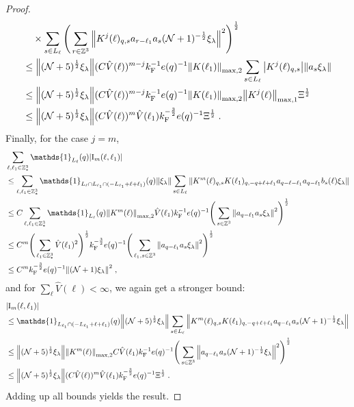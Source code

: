 \documentclass[12pt,a4paper]{article}
\numberwithin{equation}{section}
\newcommand{\1}{\mathbb{I}}
\newcommand{\F}{\mathrm{F}}
\newcommand{\I}{\mathrm{I}}
\newcommand{\Z}{\mathbb{Z}}
\newcommand{\NN}{\mathcal{N}}
\newcommand{\half}{\frac{1}{2}}
\theoremstyle{plain}
\theoremstyle{definition}
\theoremstyle{remark}
\theoremstyle{plain}
\theoremstyle{definition}
\theoremstyle{remark}
\begin{document}
\begin{proof}
\begin{align}
	&\quad \times \sum_{s\in L_{\ell}} \Bigg( \sum_{r \in \Z^3}\norm{K^{j}(\ell)_{q,s} a_{r-\ell_1} a_s (\NN+1)^{-\half} \xi_\lambda }^2 \Bigg)^\half \nonumber\\
	&\leq \norm{ (\NN+5)^{\half} \xi_\lambda}
		(C \hat{V}(\ell))^{m-j} k_{\F}^{-1} e(q)^{-1}
		\norm{K(\ell_1)}_{\max,2}
		\sum_{s\in L_{\ell}}\abs{K^{j}(\ell)_{q,s}}
		\norm{a_s \xi_\lambda }		
	\nonumber\\
	&\leq \norm{(\NN+5)^\half \xi_\lambda }
		(C \hat{V}(\ell))^{m-j} k_{\F}^{-1} e(q)^{-1}
		\norm{ K(\ell_1) }_{\max,2}
		\norm{ K^{j}(\ell)}_{\mathrm{max,1}} \Xi^\half \nonumber \\
	&\leq \norm{(\NN+5)^\half \xi_\lambda }
		(C \hat{V}(\ell))^m
		\hat{V}(\ell_1)
		k_{\F}^{-\frac 32} e(q)^{-1} \Xi^\half \;.
\end{align}
Finally, for the case $ j = m $,
\begin{align}
	&\sum_{\ell,\ell_1 \in \Z^3_*} \mathds{1}_{L_\ell}(q) |\I_m(\ell, \ell_1)| \nonumber\\
	&\leq \sum_{\ell,\ell_1 \in \Z^3_*} \mathds{1}_{L_\ell \cap L_{\ell_1} \cap (-L_{\ell_1} + \ell + \ell_1)}(q) \norm{\xi_\lambda}
		\sum\limits_{s \in L_{\ell}}
		\norm{ K^m(\ell)_{q,s} K(\ell_1)_{q,-q+\ell+\ell_1} a_{q-\ell-\ell_1} a_{q-\ell_1} b_{s}(\ell) \xi_\lambda } \nonumber\\
	&\leq C
		\sum_{\ell,\ell_1 \in \Z^3_*} \mathds{1}_{L_\ell}(q)
		\norm{K^m(\ell)}_{\max,2} \hat{V}(\ell_1) k_{\F}^{-1} e(q)^{-1}
		\Bigg(\sum\limits_{s \in \Z^3} \norm{ a_{q-\ell_1} a_s \xi_\lambda }^2\Bigg)^\half \nonumber\\
	&\leq C^m
		\Bigg( \sum_{\ell_1 \in \Z^3_*} \hat{V}(\ell_1)^2 \Bigg)^{\half}
		k_{\F}^{-\frac 32} e(q)^{-1}
		\Bigg(\sum\limits_{\ell_1,s \in \Z^3} \norm{ a_{q-\ell_1} a_s \xi_\lambda }^2\Bigg)^\half \nonumber\\
	&\leq C^m k_{\F}^{-\frac 32} e(q)^{-1} \norm{(\NN+1) \xi_\lambda }^2 \;, \label{eq:estEQ1123_Coulomb}
\end{align}
and for $ \sum_{\ell} \hat{V}(\ell) < \infty $, we again get a stronger bound:
\begin{align}
	&|\I_m(\ell, \ell_1)| \nonumber\\
	&\leq \mathds{1}_{L_{\ell_1} \cap (-L_{\ell_1} + \ell + \ell_1)}(q) \norm{(\NN+5)^{\half} \xi_\lambda}
		\sum_{s \in L_{\ell}}
		\norm{ K^m(\ell)_{q,s} K(\ell_1)_{q,-q+\ell+\ell_1} a_{q-\ell_1} a_s (\NN+1)^{-\half} \xi_\lambda } \nonumber\\
	&\leq \norm{(\NN+5)^{\half} \xi_\lambda}
		\norm{K^m(\ell)}_{\max,2}
		C \hat{V}(\ell_1) k_{\F}^{-1} e(q)^{-1}
		\Bigg(\sum_{s \in \Z^3}  \norm{ a_{q-\ell_1} a_s (\NN+1)^{-\half} \xi_\lambda }^2\Bigg)^\half \nonumber\\
	&\leq \norm{(\NN+5)^\half \xi_\lambda }
		(C \hat{V}(\ell))^m
		\hat{V}(\ell_1)
		k_{\F}^{-\frac 32} e(q)^{-1} \Xi^\half \;. \label{eq:estEQ1123}
\end{align}
Adding up all bounds yields the result.
\end{proof}
\end{document}
